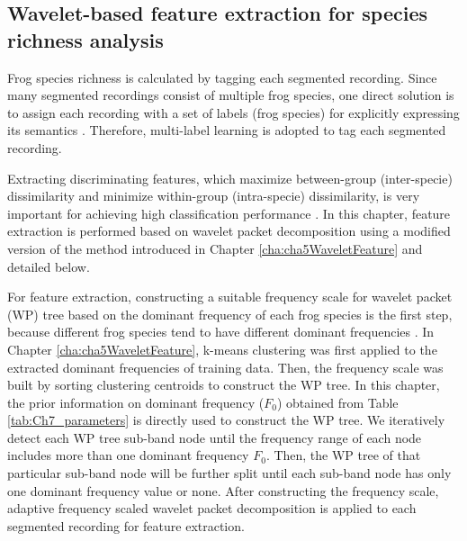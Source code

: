 \subsection{Wavelet-based feature extraction for species richness analysis}
Frog species richness is calculated by tagging each segmented recording. Since many segmented recordings consist of multiple frog species, one direct solution is to assign each recording with a set of labels (frog species) for explicitly expressing its semantics \cite{ZhangReview2014}. Therefore, multi-label learning is adopted to tag each segmented recording. 

Extracting discriminating
features, which maximize between-group (inter-specie) dissimilarity
and minimize within-group (intra-specie) dissimilarity, is very important for achieving high classification performance \cite{huang2009frog, bedoya2014automatic}. In this chapter, feature extraction is performed based on wavelet packet decomposition using a modified version of the method introduced in Chapter \ref{cha:cha5WaveletFeature} and detailed below. 

For feature extraction, constructing a suitable frequency scale for wavelet packet (WP) tree based on the dominant frequency of each frog species is the first step, because different frog species tend to have different dominant frequencies \cite{Gingras2013}. In Chapter \ref{cha:cha5WaveletFeature}, k-means clustering was first applied to the extracted dominant frequencies of training data. Then, the frequency scale was built by sorting clustering centroids to construct the WP tree. In this chapter, the prior information on dominant frequency  ($F_{0}$) obtained from Table \ref{tab:Ch7_parameters} is directly used to construct the WP tree. We iteratively detect each WP tree sub-band node until the frequency range of each node includes more than one dominant frequency $F_{0}$. Then, the WP tree of that particular sub-band node will be further split until each sub-band node has only one dominant frequency value or none. After constructing the frequency scale, adaptive frequency scaled wavelet packet decomposition is applied to each segmented recording for feature extraction. 



